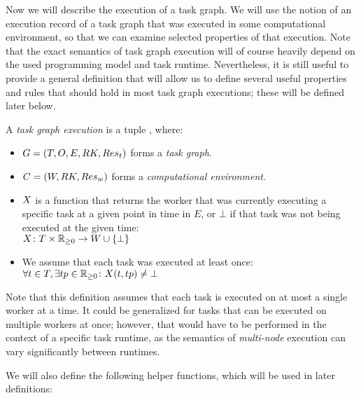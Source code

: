 Now we will describe the execution of a task graph. We will use the notion of an execution
record of a task graph that was executed in some computational environment, so that we can examine
selected properties of that execution. Note that the exact semantics of task graph execution
will of course heavily depend on the used programming model and task runtime. Nevertheless,
it is still useful to provide a general definition that will allow us to define several useful
properties and rules that should hold in most task graph executions; these will be defined
later below.

\vspace{2mm} A \emph{task graph execution}
is a tuple \taskgraphexecution, where:
\begin{itemize}[itemsep=0pt]
	\item $G = (T, O, E, RK, Res_t)$ forms a \emph{task graph}.
	\item $C = (W, RK, Res_w)$ forms a \emph{computational environment}.
	\item $X$ is a function that returns the worker that was currently
	      executing a specific task at a given point in time in $E$, or $\bot$ if that task was not
	      being executed at the given time: \\ $X\colon T \times \mathbb{R}_{\geq{}0} \rightarrow W \cup \{\bot\}$
    \item We assume that each task was executed at least once: $\forall t\in{}T, \exists tp\in\mathbb{R}_{\geq{}0}\colon X(t, tp) \neq \bot$
\end{itemize}

Note that this definition assumes that each task is executed on at most a single worker at a time.
It could be generalized for tasks that can be executed on multiple workers at once; however, that
would have to be performed in the context of a specific task runtime, as the semantics of
\emph{multi-node} execution can vary significantly between runtimes.

We will also define the following helper functions, which will be used in later definitions:

